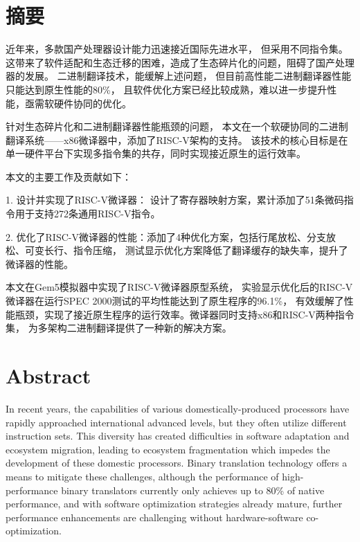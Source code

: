 \maketitle%
\MAKETITLE%
\makedeclaration%
\intobmk\chapter*{摘\quad 要}%
\setcounter{page}{1}%
近年来，多款国产处理器设计能力迅速接近国际先进水平，
但采用不同指令集。
这带来了软件适配和生态迁移的困难，造成了生态碎片化的问题，阻碍了国产处理器的发展。
二进制翻译技术，能缓解上述问题，
但目前高性能二进制翻译器性能只能达到原生性能的80\%，
且软件优化方案已经比较成熟，难以进一步提升性能，亟需软硬件协同的优化。

针对生态碎片化和二进制翻译器性能瓶颈的问题，
本文在一个软硬协同的二进制翻译系统——x86微译器中，添加了RISC-V架构的支持。
该技术的核心目标是在单一硬件平台下实现多指令集的共存，同时实现接近原生的运行效率。

本文的主要工作及贡献如下：

1. 设计并实现了RISC-V微译器：
设计了寄存器映射方案，累计添加了51条微码指令用于支持272条通用RISC-V指令。

2. 优化了RISC-V微译器的性能：添加了4种优化方案，包括行尾放松、分支放松、可变长行、指令压缩，
测试显示优化方案降低了翻译缓存的缺失率，提升了微译器的性能。

本文在Gem5模拟器中实现了RISC-V微译器原型系统，
实验显示优化后的RISC-V微译器在运行SPEC 2000测试的平均性能达到了原生程序的96.1\%，
有效缓解了性能瓶颈，实现了接近原生程序的运行效率。微译器同时支持x86和RISC-V两种指令集，
为多架构二进制翻译提供了一种新的解决方案。

\intobmk\chapter*{Abstract}%

In recent years, the capabilities of various domestically-produced processors have rapidly approached international advanced levels, but they often utilize different instruction sets. This diversity has created difficulties in software adaptation and ecosystem migration, leading to ecosystem fragmentation which impedes the development of these domestic processors. Binary translation technology offers a means to mitigate these challenges, although the performance of high-performance binary translators currently only achieves up to 80\% of native performance, and with software optimization strategies already mature, further performance enhancements are challenging without hardware-software co-optimization.

